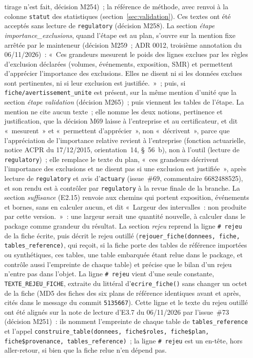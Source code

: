 \documentclass[a4paper,11pt]{article}
\newcommand{\code}[1]{\texttt{\small #1}}
\begin{document}
tirage n'est fait, décision M254)~; la référence de méthode, avec renvoi
à la colonne \code{statut} des
statistiques (section~\ref{sec:validation}). Ces textes ont été acceptés
sans lecture de \code{regulatory} (décision M258). La section \emph{étape
importance\_exclusions}, quand l'étape est au plan, s'ouvre sur la mention
fixe arrêtée par le mainteneur (décision M259~; ADR 0012, troisième
annotation du 06/11/2026)~: «~Ces grandeurs mesurent le
poids des lignes exclues par les règles d'exclusion déclarées (volumes,
événements, exposition, SMR) et permettent d'apprécier l'importance des
exclusions. Elles ne disent ni si les données exclues sont pertinentes, ni
si leur exclusion est justifiée.~»~; puis, si
\code{fiche/avertissement\_unite} est présent, sur la même mention
d'unité que la section \emph{étape validation} (décision M265)~;
puis viennent les tables de l'étape. La mention ne cite aucun texte~; elle
nomme les deux notions, pertinence et justification, que la décision M69
laisse à l'entreprise et au certificateur, et dit «~mesurent~» et
«~permettent d'apprécier~», non «~décrivent~», parce que l'appréciation
de l'importance relative revient à l'entreprise (fonction actuarielle,
notice ACPR du 17/12/2015, orientation~14, §~56~b), non à l'outil (lecture
de \code{regulatory})~; elle remplace le
texte du plan, «~ces grandeurs décrivent l'importance des exclusions et ne
disent pas si une exclusion est justifiée~», après lecture de
\code{regulatory} et avis d'\code{actuary} (issue~\#69, commentaire
6682488525), et son rendu est à contrôler par \code{regulatory} à la revue
finale de la branche. La section \emph{suffisance} (E2.15)
renvoie aux chemins qui portent exposition, événements et bornes, sans en
calculer aucun, et dit «~Largeur des intervalles~: non produite par cette
version.~»~: une largeur serait une quantité nouvelle, à calculer dans le
package comme grandeur du résultat. La section \emph{rejeu} reprend la
ligne \code{\# rejeu} de la fiche écrite, puis décrit le rejeu outillé
(\code{rejouer\_fiche(donnees, fiche, tables\_reference)}, qui reçoit, si
la fiche porte des tables de référence importées ou synthétiques, ces
tables, une table embarquée étant relue dans le package, et contrôle aussi
l'empreinte de chaque table) et
précise que le bilan d'un rejeu n'entre pas dans l'objet. La ligne
\code{\# rejeu} vient d'une seule constante, \code{TEXTE\_REJEU\_FICHE},
extraite du littéral d'\code{ecrire\_fiche()} sans changer un octet de la
fiche (MD5 des fiches des six plans de référence identiques avant et après,
cités dans le message du commit \code{5135667}). Cette ligne et le texte
du rejeu outillé ont été alignés sur la note de lecture d'E3.7 du
06/11/2026 par l'issue~\#73 (décision M251)~: ils nomment l'empreinte de
chaque table de \code{tables\_reference} et l'appel
\code{construire\_table(donnees, fiche\$roles, fiche\$plan, fiche\$provenance, tables\_reference)}~;
la ligne \code{\# rejeu} est un en-tête, hors aller-retour, si bien que la
fiche relue n'en dépend pas.
\end{document}
